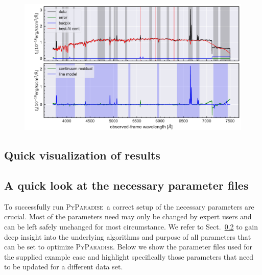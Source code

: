 \documentclass[usenatbib,usegraphicx,useAMS,onecolumn]{mn2e}
\newcommand{\PyPar}{\mbox{\textsc{PyParadise}}}
\begin{document}
\begin{figure}
 \includegraphics[width=\textwidth]{figs/example_spec/NGC2619_COMB_RSS_0.pdf}
  \caption{}\label{fig:NGC2691_example}
\end{figure}


\subsection{Quick visualization of results}

\subsection{A quick look at the necessary parameter files}
To successfully run \PyPar\ a correct setup of the necessary parameters are crucial. Most of the parameters need may only be changed by expert users and can be left safely unchanged for most circumstance. We refer to Sect.~\ref{} to gain deep insight into the underlying algorithms and purpose of all parameters that can be set to optimize \PyPar. Below we show the parameter files used for the supplied example case and highlight specifically those parameters that need to be updated for a different data set.
\end{document}
